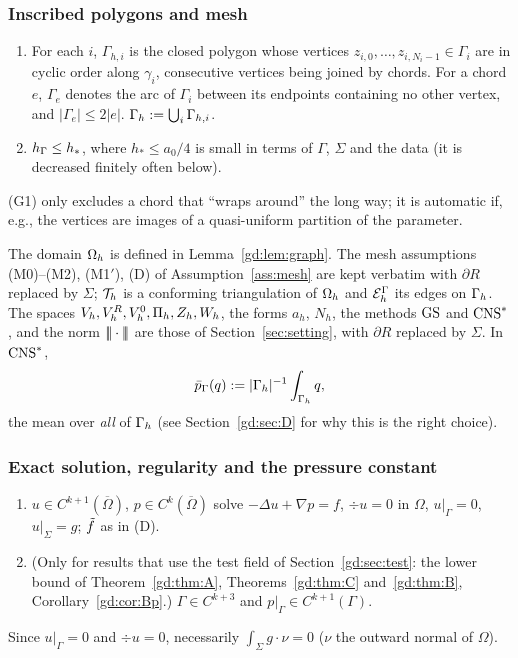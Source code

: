 \subsubsection{Inscribed polygons and mesh}
\begin{assumption}\label{gd:ass:poly}
\leavevmode
\begin{enumerate}[label=(G\arabic*)]
\item For each $i$, $\Gamma_{h,i}$ is the closed polygon whose vertices $z_{i,0},\dots,z_{i,N_i-1}\in\Gamma_i$ are in cyclic order along $\gamma_i$, consecutive vertices being joined by chords. For a chord $e$, $\Gamma_e$ denotes the arc of $\Gamma_i$ between its endpoints containing no other vertex, and $|\Gamma_e|\le2|e|$. $\Gamma_h:=\bigcup_i\Gamma_{h,i}$.
\item $h_\Gamma\le h_\ast$, where $h_\ast\le a_0/4$ is small in terms of $\Gamma$, $\Sigma$ and the data (it is decreased finitely often below).
\end{enumerate}
\end{assumption}
(G1) only excludes a chord that ``wraps around'' the long way; it is automatic if, e.g., the vertices are images of a quasi-uniform partition of the parameter.

The domain $\Omega_h$ is defined in Lemma~\ref{gd:lem:graph}. The mesh assumptions (M0)--(M2), (M1$'$), (D) of Assumption~\ref{ass:mesh} are kept verbatim with $\partial R$ replaced by $\Sigma$; $\mathcal T_h$ is a conforming triangulation of $\Omega_h$ and $\mathcal E_h^\Gamma$ its edges on $\Gamma_h$. The spaces $V_h,V_h^R,V_h^0,\Pi_h,Z_h,W_h$, the forms $a_h$, $N_h$, the methods $\mathrm{GS}$ and $\mathrm{CNS}^\ast$, and the norm $|\!|\!|\cdot|\!|\!|$ are those of Section~\ref{sec:setting}, with $\partial R$ replaced by $\Sigma$. In $\mathrm{CNS}^\ast$,
\[
\bar p_{\Gamma}(q):=|\Gamma_h|^{-1}\int_{\Gamma_h}q,
\]
the mean over \emph{all} of $\Gamma_h$ (see Section~\ref{gd:sec:D} for why this is the right choice).

\subsubsection{Exact solution, regularity and the pressure constant}
\begin{assumption}[Regularity]\label{gd:ass:reg}
\leavevmode
\begin{enumerate}[label=(R\arabic*)]
\item $u\in C^{k+1}(\overline\Omega)$, $p\in C^{k}(\overline\Omega)$ solve $-\Delta u+\nabla p=f$, $\div u=0$ in $\Omega$, $u|_\Gamma=0$, $u|_\Sigma=g$; $\tilde f$ as in (D).
\item (Only for results that use the test field of Section~\ref{gd:sec:test}: the lower bound of Theorem~\ref{gd:thm:A}, Theorems~\ref{gd:thm:C} and~\ref{gd:thm:B}, Corollary~\ref{gd:cor:Bp}.) $\Gamma\in C^{k+3}$ and $p|_\Gamma\in C^{k+1}(\Gamma)$.
\end{enumerate}
\end{assumption}
Since $u|_\Gamma=0$ and $\div u=0$, necessarily $\int_\Sigma g\cdot\nu=0$ ($\nu$ the outward normal of $\Omega$).

